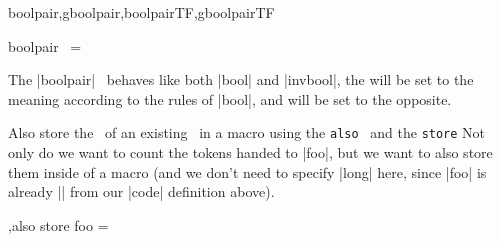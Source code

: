 \begin{function}[module=expkv-def type]{boolpair,gboolpair,boolpairTF,gboolpairTF}
  \begin{syntax}
    boolpair \key\ =  
  \end{syntax}
  The |boolpair| \type\ behaves like both |bool| and |invbool|, the 
  will be set to the meaning according to the rules of |bool|, and 
  will be set to the opposite.
\end{function}

\begin{example}
    {Also store the \val\ of an existing \key\ in a macro using the
    \texttt{also} \prefix\ and the \texttt{store} \type}
  Not only do we want to count the tokens handed to |foo|, but we want to also
  store them inside of a macro (and we don't need to specify |long| here, since
  |foo| is already |\long| from our |code| definition above).
  \begin{enverb}
        ,also store foo = \examplefoostore
  \end{enverb}
\end{example}


